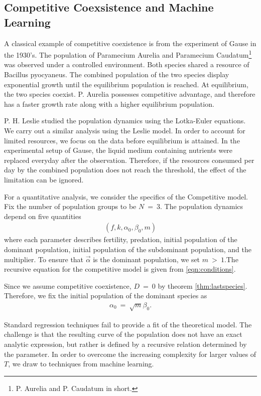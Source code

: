 \documentclass[11pt,reqno]{amsart}
\numberwithin{equation}{section}
\theoremstyle{plain}
\begin{document}
\subsection{Competitive Coexsistence and Machine Learning} \label{sec:ML}

A classical example of competitive coexistence is from the experiment of Gause in the 1930's. The population of Paramecium Aurelia and Paramecium Caudatum\footnote{P. Aurelia and P. Caudatum in short.} was observed under a controlled environment. Both species shared a resource of Bacillus pyocyaneus. The combined population of the two species display exponential growth until the equilibrium population is reached. At equilibrium, the two species coexist. P. Aurelia possesses competitive advantage, and therefore has a faster growth rate along with a higher equilibrium population. 


P. H. Leslie studied the population dynamics using the Lotka-Euler equations. We carry out a similar analysis using the Leslie model. 
In order to account for limited resources, we focus on the data before equilibrium is attained. In the experimental setup of Gause, the liquid medium containing nutrients were replaced everyday after the observation. Therefore, if the resources consumed per day by the combined population does not reach the threshold, the effect of the limitation can be ignored. 

For a quantitative analysis, we consider the specifics of the Competitive model. Fix the number of population groups to be $N \ = \  3$. The population dynamics depend on five quantities 
\begin{align}(f, k, \alpha_0, \beta_0, m)\end{align}
where each parameter describes fertility, predation, initial population of the dominant population, initial population of the subdominant population, and the multiplier. To ensure that $\vec \alpha$ is the 
dominant population, we set $m \ > \  1$.The recursive equation for the competitive model is given from \eqref{eqn:conditions}. 

Since we assume competitive coexistence, $D \ = \  0$ by theorem \ref{thm:lastspecies}. Therefore, we fix the initial population of the 
dominant species as 
\begin{align}
    \alpha_0 \ = \ \sqrt{m}\beta_0. 
\end{align}

Standard regression techniques fail to provide a fit of the theoretical model. The challenge is that the resulting curve of the population does not have an exact analytic expression, but rather is defined by a recursive relation determined by the parameter. In order to overcome the increasing complexity for larger values of $T$, we draw to techniques from machine learning. 
\end{document}
